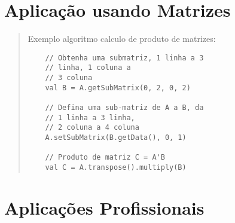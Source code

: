 \section{Aplica\c{c}\~{a}o usando Matrizes}
\begin{quote}
  \hspace{2.5mm}Exemplo algoritmo calculo de produto de matrizes:
  \cite{alexander2013scala}
  \begin{lstlisting}
    // Obtenha uma submatriz, 1 linha a 3
    // linha, 1 coluna a
    // 3 coluna
    val B = A.getSubMatrix(0, 2, 0, 2)

    // Defina uma sub-matriz de A a B, da
    // 1 linha a 3 linha,
    // 2 coluna a 4 coluna
    A.setSubMatrix(B.getData(), 0, 1)

    // Produto de matriz C = A'B
    val C = A.transpose().multiply(B)

  \end{lstlisting}
\end{quote}
\section{Aplica\c{c}\~{o}es Profissionais}

